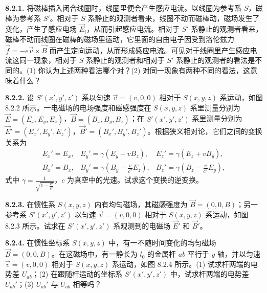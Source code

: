 \textbf{8.2.1.} 将磁棒插入闭合线圈时，线圈里便会产生感应电流。以线圈为参考系 $S$，磁棒为参考系 $S'$。相对于 $S$ 系静止的观测者看来，线圈不动而磁棒动，磁场发生了变化，产生了感应电场 $\vec{E}_i$，从而引起感应电流。相对于 $S'$ 系静止的观测者看来，磁棒不动而线圈在磁棒的磁场里运动，它里面的自由电子因受到洛伦兹力 $\vec{f} = -e\vec{v} \times \vec{B}$ 而产生定向运动，从而形成感应电流。可见对于线圈里产生感应电流这同一现象，相对于 $S$ 系静止的观测者和相对于 $S'$ 系静止的观测者的看法是不同的。(1) 你认为上述两种看法哪个对？(2) 对同一现象有两种不同的看法，这意味着什么？

\vfill
\newpage

\textbf{8.2.2.} 设 $S'(x', y', z')$ 系以匀速 $\vec{v} = (v, 0, 0)$ 相对于 $S(x, y, z)$ 系运动，如图 8.2.2 所示。一电磁场的电场强度和磁感强度在 $S(x, y, z)$ 系里测量分别为 $\vec{E} = (E_x, E_y, E_z)$，$\vec{B} = (B_x, B_y, B_z)$；在 $S'(x', y', z')$ 系里测量分别为 $\vec{E}' = (E_x', E_y', E_z')$，$\vec{B}' = (B_x', B_y', B_z')$。根据狭义相对论，它们之间的变换关系为
\[
\begin{array}{rll}
E_{x}' = E_{x}, & E_{y}' = \gamma (E_{y} - v B_{z}), & E_{z}' = \gamma (E_{z} + v B_{y}), \\
B_{x}' = B_{x}, & B_{y}' = \gamma \left(B_{y} + \frac{v}{c^{2}} E_{z}\right), & B_{z}' = \gamma \left(B_{z} - \frac{v}{c^{2}} E_{y}\right),
\end{array}
\]
式中 $\displaystyle \gamma = \frac{1}{\sqrt{1 - \frac{v^2}{c^2}}}$，$c$ 为真空中的光速。试求这个变换的逆变换。

\begin{center}
\end{center}

\vfill
\newpage

\textbf{8.2.3.} 在惯性系 $S(x, y, z)$ 内有均匀磁场，其磁感强度为 $\vec{B} = (0, 0, B)$；另一参考系 $S'(x', y', z')$ 以匀速 $\vec{v} = (v, 0, 0)$ 相对于 $S(x, y, z)$ 系运动，如图 8.2.3 所示。试求在 $S'(x', y', z')$ 系观测到的电磁场 $\vec{E}'$ 和 $\vec{B}'$。

\begin{center}
\end{center}

\vfill
\newpage

\textbf{8.2.4.} 在惯性坐标系 $S(x, y, z)$ 中，有一不随时间变化的均匀磁场 $\vec{B} = (0, 0, B)$。在这磁场中，有一静长为 $l_0$ 的金属杆 $ab$ 平行于 $y$ 轴，并以匀速 $\vec{v} = (v, 0, 0)$ 相对于 $S(x, y, z)$ 系运动，如图 8.2.4 所示。(1) 试求杆两端的电势差 $U_{ab}$；(2) 在跟随杆运动的坐标系 $S'(x', y', z')$ 中，试求杆两端的电势差 $U_{ab}'$；(3) $U_{ab}'$ 与 $U_{ab}$ 相等吗？

